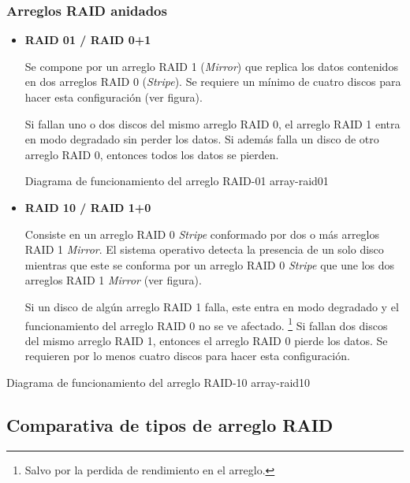 \subsubsection*{Arreglos RAID anidados}

\begin{itemize}

  \item \textbf{RAID 01 / RAID 0+1}

Se compone por un arreglo \textsc{RAID} 1 (\textit{Mirror}) que replica los datos contenidos en dos arreglos \textsc{RAID} 0 (\textit{Stripe}). Se requiere un m\'{i}nimo de cuatro discos para hacer esta configuraci\'{o}n (ver figura).

Si fallan uno o dos discos del mismo arreglo \textsc{RAID} 0, el arreglo \textsc{RAID} 1 entra en modo degradado sin perder los datos. Si adem\'{a}s falla un disco de otro arreglo \textsc{RAID} 0, entonces todos los datos se pierden.

\diagramblock
{Diagrama de funcionamiento del arreglo \textsc{RAID-01}}
{array-raid01}
{
 {
  
 }
}

\newpage
  \item \textbf{RAID 10 / RAID 1+0}

Consiste en un arreglo \textsc{RAID} 0 \textit{Stripe} conformado por dos o m\'{a}s arreglos \textsc{RAID} 1 \textit{Mirror}. El sistema operativo detecta la presencia de un solo disco mientras que este se conforma por un arreglo \textsc{RAID} 0 \textit{Stripe} que une los dos arreglos \textsc{RAID} 1 \textit{Mirror} (ver figura).

Si un disco de alg\'{u}n arreglo \textsc{RAID} 1 falla, este entra en modo degradado y el funcionamiento del arreglo \textsc{RAID} 0 no se ve afectado. \footnote{Salvo por la perdida de rendimiento en el arreglo.} Si fallan dos discos del mismo arreglo \textsc{RAID} 1, entonces el arreglo \textsc{RAID} 0 pierde los datos. Se requieren por lo menos cuatro discos para hacer esta configuraci\'{o}n.

\end{itemize}

\diagramblock
{Diagrama de funcionamiento del arreglo \textsc{RAID-10}}
{array-raid10}
{
 {
  
 }
}

\newpage
      \subsection {Comparativa de tipos de arreglo RAID}

